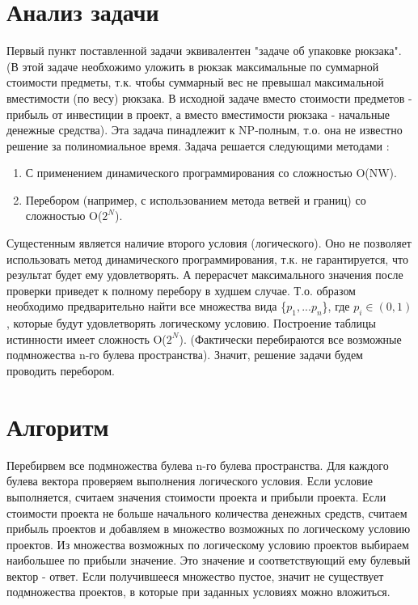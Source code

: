 \documentclass[a4paper,12pt]{article}
\begin{document}
\section{Анализ задачи}
Первый пункт поставленной задачи эквивалентен "задаче об упаковке рюкзака". \cite{discr_math} (В этой задаче необхожимо уложить в рюкзак максимальные по суммарной стоимости предметы, т.к. чтобы суммарный вес не превышал максимальной вместимости (по весу) рюкзака. В исходной задаче вместо стоимости предметов - прибыль от инвестиции в проект, а вместо вместимости рюкзака - начальные денежные средства). Эта задача пинадлежит к NP-полным, т.о. она не известно решение за полиномиальное время. Задача решается следующими методами \cite{discr_math}:
\begin{enumerate}
\item 
С применением динамического программирования со сложностью O(NW).
\item 
Перебором (например, с использованием метода ветвей и границ) со сложностью O($2^{N}$).
\end{enumerate}
Сущестенным является наличие второго условия (логического). Оно не позволяет использовать метод динамического программирования, т.к. не гарантируется, что 
результат будет ему удовлетворять. А перерасчет максимального значения после проверки приведет к полному перебору в худшем случае. Т.о. образом необходимо
предварительно найти все множества вида  \{${p_{1},...p_{n}}$\}, где $p_{i} \in (0, 1)$, которые будут удовлетворять логическому условию. Построение таблицы истинности \cite{discr_math} имеет сложность O($2^{N}$). (Фактически перебираются все возможные подмножества n-го булева пространства). Значит, решение задачи будем проводить перебором.

\section{Алгоритм}
Перебирвем все подмножества булева  n-го булева пространства. Для каждого булева вектора проверяем выполнения логического условия. Если условие выполняется, 
считаем значения стоимости проекта и прибыли проекта. Если стоимости проекта не больше начального количества денежных средств, считаем прибыль проектов и 
добавляем в множество возможных по логическому условию проектов. Из множества возможных по логическому условию проектов выбираем наибольшее по прибыли значение. Это значение и соответствующий ему булевый вектор - ответ. Если получившееся множество пустое, значит не существует подмножества проектов, в которые при заданных условиях можно вложиться.
\end{document}
